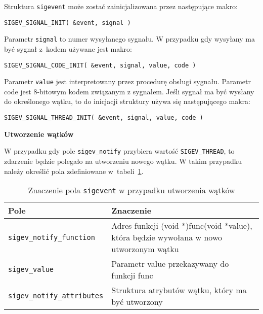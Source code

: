 Struktura \lstinline[style=MyCStyle]{sigevent} może zostać zainicjalizowana przez następujące makro: 

\begin{lstlisting}[style=MyCStyle] 
SIGEV_SIGNAL_INIT( &event, signal )
\end{lstlisting}

Parametr \lstinline[style=MyCStyle]{signal} to numer wysyłanego sygnału. W przypadku gdy wysyłany ma być sygnał z~kodem używane jest makro: 

\begin{lstlisting}[style=MyCStyle] 
SIGEV_SIGNAL_CODE_INIT( &event, signal, value, code ) 
\end{lstlisting}

Parametr \lstinline[style=MyCStyle]{value} jest interpretowany przez procedurę obsługi sygnału. Parametr code jest 8-bitowym kodem związanym z sygnałem. Jeśli sygnał ma być wysłany do określonego wątku, to do inicjacji struktury używa się następującego makra: 

\begin{lstlisting}[style=MyCStyle] 
SIGEV_SIGNAL_THREAD_INIT( &event, signal, value, code )
\end{lstlisting}

\noindent 
\textbf{Utworzenie wątków}

W przypadku gdy pole \lstinline[style=MyCStyle]{sigev_notify} przybiera wartość \lstinline[style=MyCStyle]{SIGEV_THREAD}, to zdarzenie będzie polegało na utworzeniu nowego wątku. W takim przypadku należy określić pola zdefiniowane w~tabeli~\ref{tab:sigevent4}.  

\begin{table}[h!]
\centering
\caption{Znaczenie pola  \lstinline[style=MyCStyle]{sigevent} w przypadku utworzenia wątków}
\setlength{\arrayrulewidth}{1pt}
\setlength{\tabcolsep}{6pt}
\renewcommand{\arraystretch}{1.2}
\begin{tabular}{ |p{}|p{}|}
\hline \rowcolor{gray}
\textbf{Pole} & \textbf{Znaczenie} \\ \hline
\mbox{\lstinline[style=MyCStyle]{sigev_notify_function}} & Adres funkcji (void *)func(void *value), która będzie wywołana w nowo utworzonym wątku \\ \hline
\mbox{\lstinline[style=MyCStyle]{sigev_value}} & Parametr value przekazywany do funkcji func \\ \hline
\mbox{\lstinline[style=MyCStyle]{sigev_notify_attributes}} & Struktura atrybutów wątku, który ma być utworzony \\ \hline
\end{tabular}
\label{tab:sigevent4}
\end{table}

